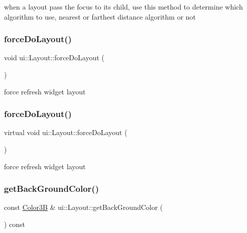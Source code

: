 when a layout pass the focus to it\textquotesingle{}s child, use this method to determine which algorithm to use, nearest or farthest distance algorithm or not \mbox{\label{classui_1_1Layout_a280952253418e0951ecdff43172a3c68}} 
\subsubsection{\texorpdfstring{force\+Do\+Layout()}{forceDoLayout()}\hspace{0.1cm}{\footnotesize\ttfamily [1/2]}}
{\footnotesize\ttfamily void ui\+::\+Layout\+::force\+Do\+Layout (\begin{DoxyParamCaption}{ }\end{DoxyParamCaption})\hspace{0.3cm}{\ttfamily [virtual]}}

force refresh widget layout \mbox{\label{classui_1_1Layout_a9e690a2f773cc3eb77f0cff5959782e1}} 
\subsubsection{\texorpdfstring{force\+Do\+Layout()}{forceDoLayout()}\hspace{0.1cm}{\footnotesize\ttfamily [2/2]}}
{\footnotesize\ttfamily virtual void ui\+::\+Layout\+::force\+Do\+Layout (\begin{DoxyParamCaption}{ }\end{DoxyParamCaption})\hspace{0.3cm}{\ttfamily [virtual]}}

force refresh widget layout \mbox{\label{classui_1_1Layout_ae0c979e8b123af5a0debce8d368e3838}} 
\subsubsection{\texorpdfstring{get\+Back\+Ground\+Color()}{getBackGroundColor()}\hspace{0.1cm}{\footnotesize\ttfamily [1/2]}}
{\footnotesize\ttfamily const \hyperlink{structColor3B}{Color3B} \& ui\+::\+Layout\+::get\+Back\+Ground\+Color (\begin{DoxyParamCaption}{ }\end{DoxyParamCaption}) const}

